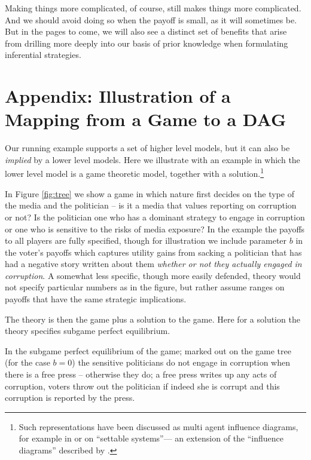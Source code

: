 \documentclass[12pt,]{book}
\let\rmarkdownfootnote\footnote%
\def\footnote{\protect\rmarkdownfootnote}
\begin{document}
Making things more complicated, of course, still makes things more complicated. And we should avoid doing so when the payoff is small, as it will sometimes be. But in the pages to come, we will also see a distinct set of benefits that arise from drilling more deeply into our basis of prior knowledge when formulating inferential strategies.

\hypertarget{appendix-illustration-of-a-mapping-from-a-game-to-a-dag}{%
\section{Appendix: Illustration of a Mapping from a Game to a DAG}\label{appendix-illustration-of-a-mapping-from-a-game-to-a-dag}}

Our running example supports a set of higher level models, but it can also be \emph{implied} by a lower level models. Here we illustrate with an example in which the lower level model is a game theoretic model, together with a solution.\footnote{Such representations have been discussed as multi agent influence diagrams, for example in \citet{koller2003multi} or \citet{white2009settable} on ``settable systems''--- an extension of the ``influence diagrams'' described by \citet{dawid2002influence}.}

In Figure \ref{fig:tree} we show a game in which nature first decides on the type of the media and the politician -- is it a media that values reporting on corruption or not? Is the politician one who has a dominant strategy to engage in corruption or one who is sensitive to the risks of media exposure? In the example the payoffs to all players are fully specified, though for illustration we include parameter \(b\) in the voter's payoffs which captures utility gains from sacking a politician that has had a negative story written about them \emph{whether or not they actually engaged in corruption}. A somewhat less specific, though more easily defended, theory would not specify particular numbers as in the figure, but rather assume ranges on payoffs that have the same strategic implications.

The theory is then the game plus a solution to the game. Here for a solution the theory specifies subgame perfect equilibrium.

In the subgame perfect equilibrium of the game; marked out on the game tree (for the case \(b=0\)) the sensitive politicians do not engage in corruption when there is a free press -- otherwise they do; a free press writes up any acts of corruption, voters throw out the politician if indeed she is corrupt and this corruption is reported by the press.
\end{document}
